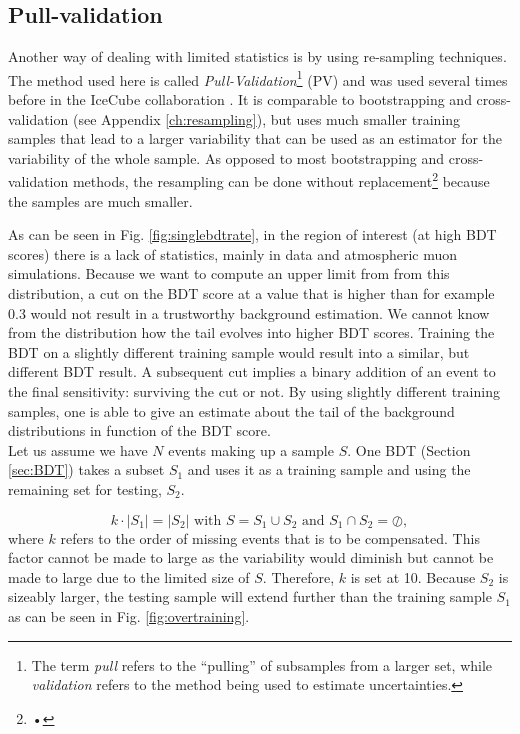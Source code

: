 \subsection{Pull-validation}
\label{subsec:pv}
Another way of dealing with limited statistics is by using re-sampling techniques. The method used here is called \textit{Pull-Validation}\footnote{The term \textit{pull} refers to the ``pulling'' of subsamples from a larger set, while \textit{validation} refers to the method being used to estimate uncertainties.} (PV) and was used several times before in the IceCube collaboration \cite{Anna, Jan, atmospheric muons, ...}. It is comparable to bootstrapping and cross-validation (see Appendix \ref{ch:resampling}), but uses much smaller training samples that lead to a larger variability that can be used as an estimator for the variability of the whole sample. As opposed to most bootstrapping and cross-validation methods, the resampling can be done without replacement\footnote{•} because the samples are much smaller.

As can be seen in Fig. \ref{fig:singlebdtrate}, in the region of interest (at high BDT scores) there is a lack of statistics, mainly in data and atmospheric muon simulations. Because we want to compute an upper limit from from this distribution, a cut on the BDT score at a value that is higher than for example 0.3 would not result in a trustworthy background estimation. We cannot know from the distribution how the tail evolves into higher BDT scores. Training the BDT on a slightly different training sample would result into a similar, but different BDT result. A subsequent cut implies a binary addition of an event to the final sensitivity: surviving the cut or not. By using slightly different training samples, one is able to give an estimate about the tail of the background distributions in function of the BDT score.\\

\noindent Let us assume we have $N$ events making up a sample $S$. One BDT (Section \ref{sec:BDT}) takes a subset $S_1$ and uses it as a training sample and using the remaining set for testing, $S_2$. 

\begin{equation}
k \cdot \left| S_1 \right| = \left| S_2 \right| \textrm{ with } S = S_1 \cup S_2 \textrm{ and } S_1 \cap S_2 = \oslash, 
\end{equation}
where $k$ refers to the order of missing events that is to be compensated. This factor cannot be made to large as the variability would diminish but cannot be made to large due to the limited size of $S$. Therefore, $k$ is set at 10. Because $S_2$ is sizeably larger, the testing sample will extend further than the training sample $S_1$ as can be seen in Fig. \ref{fig:overtraining}. 

